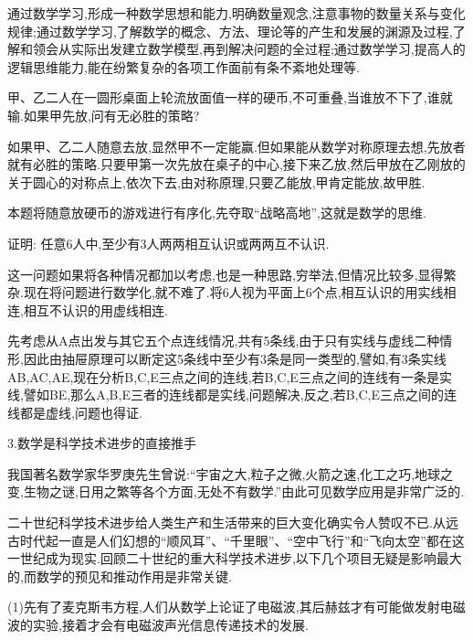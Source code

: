 通过数学学习,形成一种数学思想和能力,明确数量观念,注意事物的数量关系与变化规律;通过数学学习,了解数学的概念、方法、理论等的产生和发展的渊源及过程,了解和领会从实际出发建立数学模型,再到解决问题的全过程;通过数学学习,提高人的逻辑思维能力,能在纷繁复杂的各项工作面前有条不紊地处理等.

\begin{example}
	甲、乙二人在一圆形桌面上轮流放面值一样的硬币,不可重叠,当谁放不下了,谁就输.如果甲先放,问有无必胜的策略?
\end{example}

\begin{analysis}
	如果甲、乙二人随意去放,显然甲不一定能赢.但如果能从数学对称原理去想,先放者就有必胜的策略.只要甲第一次先放在桌子的中心,接下来乙放,然后甲放在乙刚放的关于圆心的对称点上,依次下去,由对称原理,只要乙能放,甲肯定能放,故甲胜.

	本题将随意放硬币的游戏进行有序化,先夺取“战略高地”,这就是数学的思维.
\end{analysis}

\begin{example}
	证明: 任意6人中,至少有3人两两相互认识或两两互不认识.
\end{example}

\begin{analysis}
	这一问题如果将各种情况都加以考虑,也是一种思路,穷举法,但情况比较多,显得繁杂.现在将问题进行数学化,就不难了.将6人视为平面上6个点,相互认识的用实线相连,相互不认识的用虚线相连.

	先考虑从A点出发与其它五个点连线情况,共有5条线,由于只有实线与虚线二种情形,因此由抽屉原理可以断定这5条线中至少有3条是同一类型的,譬如,有3条实线AB,AC,AE,现在分析B,C,E三点之间的连线,若B,C,E三点之间的连线有一条是实线,譬如BE,那么A,B,E三者的连线都是实线,问题解决,反之,若B,C,E三点之间的连线都是虚线,问题也得证.
\end{analysis}

3.数学是科学技术进步的直接推手

我国著名数学家华罗庚先生曾说:“宇宙之大,粒子之微,火箭之速,化工之巧,地球之变,生物之谜,日用之繁等各个方面,无处不有数学.”由此可见数学应用是非常广泛的.

二十世纪科学技术进步给人类生产和生活带来的巨大变化确实令人赞叹不已.从远古时代起一直是人们幻想的“顺风耳”、“千里眼”、“空中飞行”和“飞向太空”都在这一世纪成为现实.回顾二十世纪的重大科学技术进步,以下几个项目无疑是影响最大的,而数学的预见和推动作用是非常关键.

(1)先有了麦克斯韦方程,人们从数学上论证了电磁波,其后赫兹才有可能做发射电磁波的实验,接着才会有电磁波声光信息传递技术的发展.

